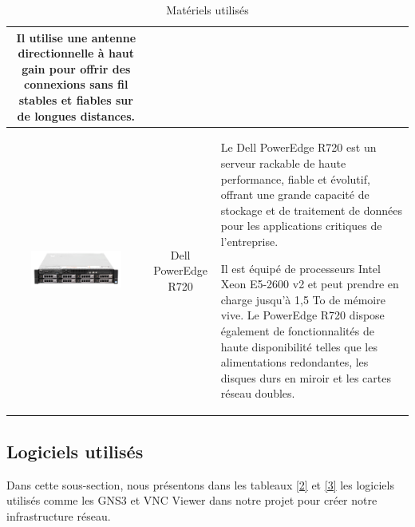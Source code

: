 \begin{table}[H]
\begin{center}
\begin{tabular}{|c{3cm}|c{3cm}|l{10cm}|}
Il utilise une antenne directionnelle à haut gain pour offrir des connexions sans fil stables et fiables sur de longues distances.  \\
\hline
\includegraphics[width=3cm]{Images/dellr720.png} & Dell PowerEdge R720 & Le Dell PowerEdge R720 est un serveur rackable de haute performance, fiable et évolutif, offrant une grande capacité de stockage et de traitement de données pour les applications critiques de l'entreprise. 

Il est équipé de processeurs Intel Xeon E5-2600 v2 et peut prendre en charge jusqu'à 1,5 To de mémoire vive. Le PowerEdge R720 dispose également de fonctionnalités de haute disponibilité telles que les alimentations redondantes, les disques durs en miroir et les cartes réseau doubles. \\
\hline
\end{tabular}
\caption{Matériels utilisés}
\label{1}
\end{center}
\end{table}


\subsection{Logiciels utilisés}

Dans cette sous-section, nous présentons dans les tableaux \ref{2} et \ref{3} les logiciels utilisés comme les GNS3 et VNC Viewer dans notre projet pour créer notre infrastructure réseau. 


